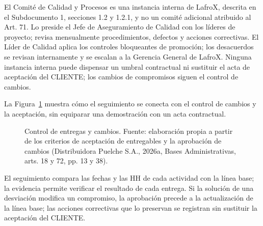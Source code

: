 El Comité de Calidad y Procesos es una instancia interna de LafroX, descrita en el Subdocumento 1, secciones 1.2 y 1.2.1, y no un comité adicional atribuido al Art. 71. Lo preside el Jefe de Aseguramiento de Calidad con los líderes de proyecto; revisa mensualmente procedimientos, defectos y acciones correctivas. El Líder de Calidad aplica los controles bloqueantes de promoción; los desacuerdos se revisan internamente y se escalan a la Gerencia General de LafroX. Ninguna instancia interna puede dispensar un umbral contractual ni sustituir el acta de aceptación del CLIENTE; los cambios de compromisos siguen el control de cambios.

La Figura~\ref{fig:sd6-control} muestra cómo el seguimiento se conecta con el control de cambios y la aceptación, sin equiparar una demostración con un acta contractual.

\begin{figure}[H]
\centering
{}
\caption[Control de entregas y cambios.]{Control de entregas y cambios. Fuente: elaboración propia a partir de los criterios de aceptación de entregables y la aprobación de cambios (Distribuidora Puelche S.A., 2026a, Bases Administrativas, arts. 18 y 72, pp. 13 y 38).}
\label{fig:sd6-control}
\end{figure}

El seguimiento compara las fechas y las HH de cada actividad con la línea base; la evidencia permite verificar el resultado de cada entrega. Si la solución de una desviación modifica un compromiso, la aprobación precede a la actualización de la línea base; las acciones correctivas que lo preservan se registran sin sustituir la aceptación del CLIENTE.

